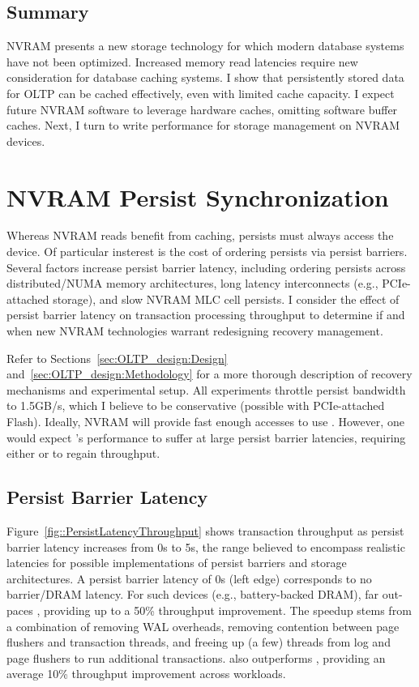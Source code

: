 \subsection{Summary}
\label{sec:OLTP_eval:Reads:Summary}
NVRAM presents a new storage technology for which modern database systems have not been optimized.
Increased memory read latencies require new consideration for database caching systems.
I show that persistently stored data for OLTP can be cached effectively, even with limited cache capacity.
I expect future NVRAM software to leverage hardware caches, omitting software buffer caches.
Next, I turn to write performance for storage management on NVRAM devices.

\section{NVRAM Persist Synchronization}
\label{sec:OLTP_eval:Persists}

Whereas NVRAM reads benefit from caching, persists must always access the device.
Of particular insterest is the cost of ordering persists via persist barriers.
Several factors increase persist barrier latency, including ordering persists across distributed/NUMA memory architectures, long latency interconnects (e.g., PCIe-attached storage), and slow NVRAM MLC cell persists.
I consider the effect of persist barrier latency on transaction processing throughput to determine if and when new NVRAM technologies warrant redesigning recovery management.

Refer to Sections~\ref{sec:OLTP_design:Design} and~\ref{sec:OLTP_design:Methodology} for a more thorough description of recovery mechanisms and experimental setup.
All experiments throttle persist bandwidth to 1.5GB/s, which I believe to be conservative (possible with PCIe-attached Flash).
Ideally, NVRAM will provide fast enough accesses to use \InPlace.
However, one would expect \InPlace's performance to suffer at large persist barrier latencies, requiring either \NVDisk or \GroupCommit to regain throughput.

\subsection{Persist Barrier Latency}
\label{sec:OLTP_eval:Persists:Performance}



Figure~\ref{fig::PersistLatencyThroughput} shows transaction throughput as persist barrier latency increases from 0\textmu s to 5\textmu s, the range believed to encompass realistic latencies for possible implementations of persist barriers and storage architectures.
A persist barrier latency of 0\textmu s (left edge) corresponds to no barrier/DRAM latency.
For such devices (e.g., battery-backed DRAM), \InPlace far out-paces \NVDisk, providing up to a 50\% throughput improvement.
The speedup stems from a combination of removing WAL overheads, removing contention between page flushers and transaction threads, and freeing up (a few) threads from log and page flushers to run additional transactions.
\InPlace also outperforms \GroupCommit, providing an average 10\% throughput improvement across workloads.

